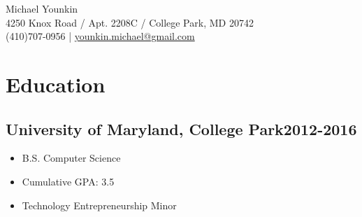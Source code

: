 \documentclass{article}
\newcommand{\subsectiondate}[2]{\subsection*{#1\hfill#2}}
\begin{document}
\begin{center}
    {\LARGE Michael Younkin}\\
    4250 Knox Road / Apt. 2208C / College Park, MD 20742\\
    (410)707-0956 | \href{mailto:younkin.michael@gmail.com}{younkin.michael@gmail.com}
\end{center}

\section*{Education}

\subsectiondate{University of Maryland, College Park}{2012-2016}

\begin{itemize}
    \item B.S. Computer Science
    \item Cumulative GPA: 3.5
    \item Technology Entrepreneurship Minor
\end{itemize}
\end{document}

